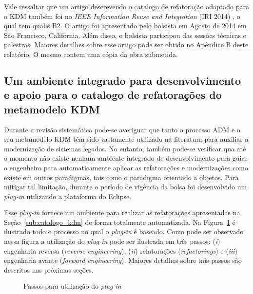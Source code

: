 Vale ressaltar que um artigo descrevendo o catalogo de refatoração adaptado para o KDM também foi no \textit{IEEE Information Reuse and Integration} (IRI 2014) , o qual tem qualis B2. O artigo foi apresentado pelo bolsista em Agosto de 2014 em São Francisco, California. Além disso, o bolsista participou das sessões técnicas e palestras. Maiores detalhes sobre esse artigo pode ser obtido no Apêndice B deste relatório. O mesmo contem uma cópia da obra submetida.

\subsection{Um ambiente integrado para desenvolvimento e apoio para o catalogo de refatorações do metamodelo KDM}

Durante a revisão sistemática pode-se averiguar que tanto o processo ADM e o seu metamodelo KDM têm sido vastamente utilizado na literatura para auxiliar a modernização de sistemas legados. No entanto, também pode-se verificar qua até o momento não existe nenhum ambiente integrado de desenvolvimento para guiar o engenheiro para automaticamente aplicar as refatorações e modernizações como existe em outros paradigmas, tais como o paradigma orientado a objetos. Para mitigar tal limitação, durante o período de vigência da bolsa foi desenvolvido um \textit{plug-in} utilizando a plataforma do Eclipse. 

Esse \textit{plug-in} fornece um ambiente para realizar as refatorações apresentadas na Seção~\ref{sub:catalogo_kdm} de forma totalmente automatizada. Na Figura~\ref{fig:ferramenta} é ilustrado todo o processo no qual o \textit{plug-in} é baseado. Como pode ser observado nessa figura a utilização do \textit{plug-in} pode ser ilustrada em três passos: (\textit{i}) engenharia reversa (\textit{reverse engineering}), (\textit{ii}) refatorações (\textit{refactorings}) e (\textit{iii}) engenharia avante (\textit{forward engineering}). Maiores detalhes sobre tais passos são descritos nas próximas seções.

\begin{figure}[!h]
 \centering

\caption{Passos para utilização do \textit{plug-in}}
 \label{fig:ferramenta}
\end{figure}


